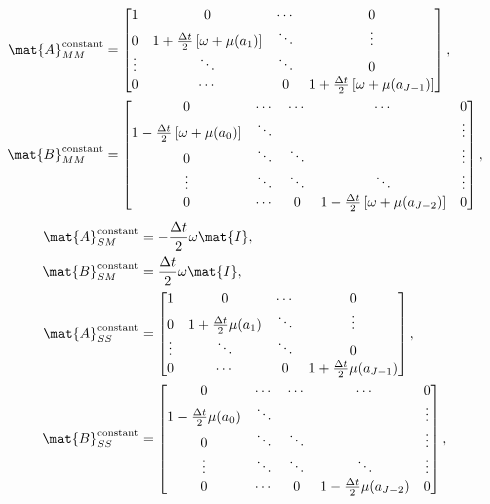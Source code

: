\documentclass{jpmarticle}
\begin{document}
\begin{equation}
  \begin{split}
    \mat{A}_{MM}^{\text{constant}} &=
    \begin{bmatrix}
      1 & 0 & \cdots & 0
      \\
      0 & 1 + \frac{\Delta t}{2} \left[\omega + \mu(a_1)\right] &
      \ddots & \vdots
      \\
      \vdots & \ddots & \ddots & 0
      \\
      0 & \cdots & 0 &
      1 + \frac{\Delta t}{2} \left[\omega + \mu(a_{J - 1})\right]
    \end{bmatrix},
    \\
    \mat{B}_{MM}^{\text{constant}} &=
    \begin{bmatrix}
      0 & \cdots & \cdots & \cdots & 0
      \\
      1 - \frac{\Delta t}{2} \left[\omega + \mu(a_0)\right] & \ddots &
      & & \vdots
      \\
      0 & \ddots & \ddots & & \vdots
      \\
      \vdots & \ddots & \ddots & \ddots & \vdots
      \\
      0 & \cdots & 0 &
      1 - \frac{\Delta t}{2} \left[\omega + \mu(a_{J - 2})\right] & 0
    \end{bmatrix},
  \end{split}
\end{equation}
\begin{equation}
  \begin{split}
    \mat{A}_{SM}^{\text{constant}} &=
    - \frac{\Delta t}{2} \omega \mat{I},
    \\
    \mat{B}_{SM}^{\text{constant}} &=
    \frac{\Delta t}{2} \omega \mat{I},
    \\
    \mat{A}_{SS}^{\text{constant}} &=
    \begin{bmatrix}
      1 & 0 & \cdots & 0
      \\
      0 & 1 + \frac{\Delta t}{2} \mu(a_1) &
      \ddots & \vdots
      \\
      \vdots & \ddots & \ddots & 0
      \\
      0 & \cdots & 0 &
      1 + \frac{\Delta t}{2} \mu(a_{J - 1})
    \end{bmatrix},
    \\
    \mat{B}_{SS}^{\text{constant}} &=
    \begin{bmatrix}
      0 & \cdots & \cdots & \cdots & 0
      \\
      1 - \frac{\Delta t}{2} \mu(a_0) & \ddots &
      & & \vdots
      \\
      0 & \ddots & \ddots & & \vdots
      \\
      \vdots & \ddots & \ddots & \ddots & \vdots
      \\
      0 & \cdots & 0 &
      1 - \frac{\Delta t}{2} \mu(a_{J - 2}) & 0
    \end{bmatrix},
  \end{split}
\end{equation}
\end{document}
